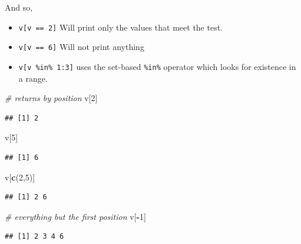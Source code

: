 \documentclass[
]{book}
\newenvironment{Shaded}{\begin{snugshade}}{\end{snugshade}}
\newcommand{\CommentTok}[1]{\textcolor[rgb]{0.56,0.35,0.01}{\textit{#1}}}
\newcommand{\DecValTok}[1]{\textcolor[rgb]{0.00,0.00,0.81}{#1}}
\newcommand{\KeywordTok}[1]{\textcolor[rgb]{0.13,0.29,0.53}{\textbf{#1}}}
\newcommand{\NormalTok}[1]{#1}
\newcommand{\OperatorTok}[1]{\textcolor[rgb]{0.81,0.36,0.00}{\textbf{#1}}}
\providecommand{\tightlist}{%
  \setlength{\itemsep}{0pt}\setlength{\parskip}{0pt}}
\begin{document}
And so,

\begin{itemize}
\tightlist
\item
  \texttt{v{[}v\ ==\ 2{]}} Will print only the values that meet the test.
\item
  \texttt{v{[}v\ ==\ 6{]}} Will not print anything
\item
  \texttt{v{[}v\ \%in\%\ 1:3{]}} uses the set-based \texttt{\%in\%} operator which looks for existence in a range.
\end{itemize}

\begin{Shaded}
\begin{Highlighting}[]
\CommentTok{# returns by position}
\NormalTok{v[}\DecValTok{2}\NormalTok{]}
\end{Highlighting}
\end{Shaded}

\begin{verbatim}
## [1] 2
\end{verbatim}

\begin{Shaded}
\begin{Highlighting}[]
\NormalTok{v[}\DecValTok{5}\NormalTok{]}
\end{Highlighting}
\end{Shaded}

\begin{verbatim}
## [1] 6
\end{verbatim}

\begin{Shaded}
\begin{Highlighting}[]
\NormalTok{v[}\KeywordTok{c}\NormalTok{(}\DecValTok{2}\NormalTok{,}\DecValTok{5}\NormalTok{)]}
\end{Highlighting}
\end{Shaded}

\begin{verbatim}
## [1] 2 6
\end{verbatim}

\begin{Shaded}
\begin{Highlighting}[]
\CommentTok{# everything but the first position}
\NormalTok{v[}\OperatorTok{-}\DecValTok{1}\NormalTok{]}
\end{Highlighting}
\end{Shaded}

\begin{verbatim}
## [1] 2 3 4 6
\end{verbatim}
\end{document}
